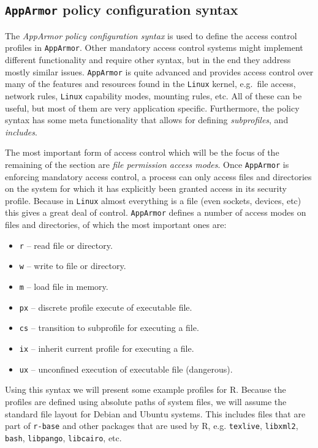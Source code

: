 \documentclass[article]{jss}
\newcommand{\R}{\textsf{R}\xspace}
\newcommand{\AppArmor}{\texttt{AppArmor}\xspace}
\newcommand{\Linux}{\texttt{Linux}\xspace}
\begin{document}
\subsection[AppArmor policy configuration syntax]{\AppArmor policy configuration
syntax}
\label{syntax}

The \emph{AppArmor policy configuration syntax} is used to define the access
control profiles in \AppArmor. Other mandatory access control systems
might implement different functionality and require other syntax, but in the end
they address mostly similar issues. \AppArmor is quite advanced and provides
access control over many of the features and resources found in the \Linux
kernel, e.g.\ file access, network rules, \Linux capability modes, mounting
rules, etc. All of these can be useful, but most of them are very application
specific. Furthermore, the policy syntax has some meta functionality that
allows for defining \emph{subprofiles}, and \emph{includes}.

The most important form of access control which will be the focus of the
remaining of the section are \emph{file permission access modes}. Once \AppArmor
is enforcing mandatory access control, a process can only access files and
directories on the system for which it has explicitly been granted access in
its security profile. Because in \Linux almost everything is a file
(even sockets, devices, etc) this gives a great deal of control. \AppArmor
defines a number of access modes on files and directories, of which the most
important ones are:

\begin{itemize}
  \item[] \texttt{r} -- read file or directory.
  \item[] \texttt{w} -- write to file or directory.
  \item[] \texttt{m} -- load file in memory.
  \item[] \texttt{px} -- discrete profile execute of executable file.
  \item[] \texttt{cs} -- transition to subprofile for executing a file.
  \item[] \texttt{ix} -- inherit current profile for executing a file.
  \item[] \texttt{ux} -- unconfined execution of executable file (dangerous).
\end{itemize}

Using this syntax we will present some example profiles for \R. Because the
profiles are defined using absolute paths of system files, we will assume the
standard file layout for Debian and Ubuntu systems. This includes files that
are part of \texttt{r-base} and other packages that are used by \R, e.g.
\texttt{texlive}, \texttt{libxml2}, \texttt{bash}, \texttt{libpango},
\texttt{libcairo}, etc.
\end{document}
